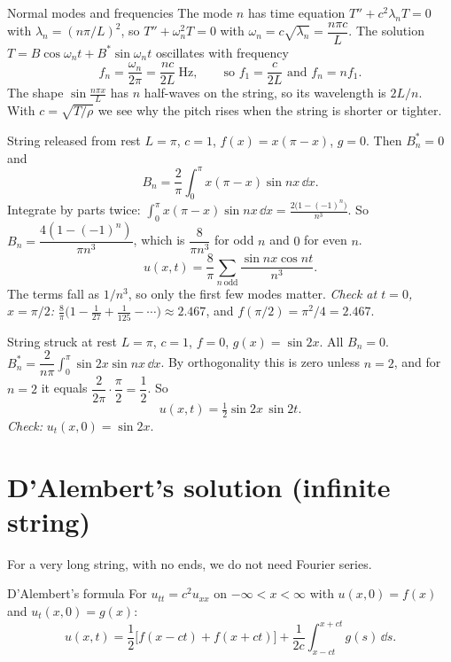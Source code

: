 \begin{derivbox}{Normal modes and frequencies}
The mode $n$ has time equation $T'' + c^2\lambda_nT = 0$ with $\lambda_n = (n\pi/L)^2$, so $T'' + \omega_n^2T = 0$ with $\omega_n = c\sqrt{\lambda_n} = \dfrac{n\pi c}{L}$. The solution $T = B\cos\omega_nt + B^*\sin\omega_nt$ oscillates with frequency
\[ f_n = \frac{\omega_n}{2\pi} = \frac{nc}{2L}\ \text{Hz}, \qquad\text{so } f_1 = \frac{c}{2L}\text{ and } f_n = nf_1. \]
The shape $\sin\frac{n\pi x}{L}$ has $n$ half-waves on the string, so its wavelength is $2L/n$. With $c = \sqrt{T/\rho}$ we see why the pitch rises when the string is shorter or tighter.
\end{derivbox}

\begin{examplebox}{String released from rest}
$L=\pi$, $c=1$, $f(x) = x(\pi - x)$, $g = 0$. Then $B_n^*=0$ and
\[ B_n = \frac2\pi\int_0^\pi x(\pi-x)\sin nx\,\dd x. \]
Integrate by parts twice: $\displaystyle\int_0^\pi x(\pi-x)\sin nx\,\dd x = \frac{2\big(1-(-1)^n\big)}{n^3}$. So $B_n = \dfrac{4(1-(-1)^n)}{\pi n^3}$, which is $\dfrac{8}{\pi n^3}$ for odd $n$ and $0$ for even $n$.
\[ u(x,t) = \frac8\pi\sum_{n\ \text{odd}}\frac{\sin nx\cos nt}{n^3}. \]
The terms fall as $1/n^3$, so only the first few modes matter. \textit{Check at $t=0$, $x=\pi/2$:} $\frac8\pi\big(1 - \frac1{27} + \frac1{125} - \cdots\big)\approx 2.467$, and $f(\pi/2) = \pi^2/4 = 2.467$. \checkmark
\end{examplebox}

\begin{examplebox}{String struck at rest}
$L=\pi$, $c=1$, $f=0$, $g(x) = \sin 2x$. All $B_n=0$. $B_n^* = \dfrac{2}{n\pi}\displaystyle\int_0^\pi\sin 2x\sin nx\,\dd x$. By orthogonality this is zero unless $n=2$, and for $n=2$ it equals $\dfrac{2}{2\pi}\cdot\dfrac\pi2 = \dfrac12$. So
\[ u(x,t) = \tfrac12\sin 2x\,\sin 2t. \]
\textit{Check:} $u_t(x,0) = \sin 2x$. \checkmark
\end{examplebox}

\section{D'Alembert's solution (infinite string)}

For a very long string, with no ends, we do not need Fourier series.

\begin{defbox}{D'Alembert's formula}
For $u_{tt} = c^2u_{xx}$ on $-\infty<x<\infty$ with $u(x,0)=f(x)$ and $u_t(x,0)=g(x)$:
\[ u(x,t) = \frac12\big[f(x-ct) + f(x+ct)\big] + \frac{1}{2c}\int_{x-ct}^{x+ct}g(s)\,\dd s. \]
\end{defbox}

